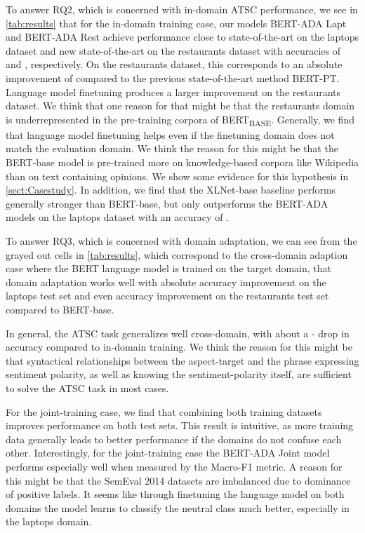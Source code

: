 \documentclass[11pt,a4paper]{article}
\begin{document}
To answer RQ2, which is concerned with in-domain ATSC performance, we see in \autoref{tab:results} that for the in-domain training case, our models BERT-ADA Lapt and BERT-ADA Rest achieve performance close to state-of-the-art on the laptops dataset and new state-of-the-art on the restaurants dataset with accuracies of  and , respectively. On the restaurants dataset, this corresponds to an absolute improvement of  compared to the previous state-of-the-art method BERT-PT.
Language model finetuning produces a larger improvement on the restaurants dataset. We think that one reason for that might be that the restaurants domain is underrepresented in the pre-training corpora of BERT\textsubscript{BASE}.
Generally, we find that language model finetuning helps even if the finetuning domain does not match the evaluation domain. We think the reason for this might be that the BERT-base model is pre-trained more on knowledge-based corpora like Wikipedia than on text containing opinions. We show some evidence for this hypothesis in \autoref{sect:Casestudy}.
In addition, we find that the XLNet-base baseline performs generally stronger than BERT-base, but only outperforms the BERT-ADA models on the laptops dataset with an accuracy of  .

To answer RQ3, which is concerned with domain adaptation, we can see from the grayed out cells in \autoref{tab:results}, which
correspond to the cross-domain adaption case where the BERT language model is trained on the target domain, that domain adaptation works well with  absolute accuracy improvement on the laptops test set and even  accuracy improvement on the restaurants test set compared to BERT-base.

In general, the ATSC task generalizes well cross-domain, with about a - drop in accuracy compared to in-domain training. We think the reason for this might be 
that syntactical relationships between the aspect-target and the phrase expressing sentiment polarity, as well as knowing the sentiment-polarity itself, are sufficient to solve the ATSC task in most cases.

For the joint-training case, we find that combining both training datasets improves performance on both test sets.
This result is intuitive, as more training data generally leads to better performance if the domains do not confuse each other.
Interestingly, for the joint-training case the BERT-ADA Joint model
performs especially well when measured by the Macro-F1 metric. A reason for this 
might be that the SemEval 2014 datasets are imbalanced due to dominance of positive labels. 
It seems like through finetuning the language model on both domains the model learns to classify the neutral class much better, especially in the laptops domain.
\end{document}
